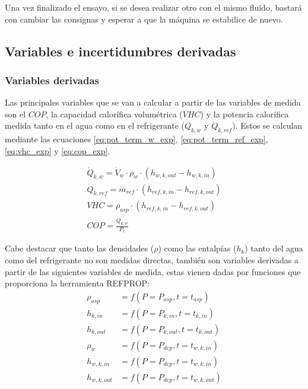 \documentclass[../main.tex]{subfiles}
\begin{document}
Una vez finalizado el ensayo, si se desea realizar otro con el mismo fluido, bastará con cambiar las consignas y esperar a que la máquina se estabilice de nuevo.

\newpage

\subsection{Variables e incertidumbres derivadas}

\subsubsection{Variables derivadas}

Las principales variables que se van a calcular a partir de las variables de medida son el $COP$, la capacidad calorífica volumétrica ($VHC$) y la potencia calorífica medida tanto en el agua como en el refrigerante ($\dot{Q}_{k,w}$ y $\dot{Q}_{k,ref}$). Estos se calculan mediante las ecuaciones \ref{eq:pot_term_w_exp}, \ref{eq:pot_term_ref_exp}, \ref{eq:vhc_exp} y \ref{eq:cop_exp}.

\begin{gather}
    \dot{Q}_{k,w} = \dot{V}_{w} \cdot \rho_{w} \cdot \left( h_{w, k, out} - h_{w, k, in} \right)
    \label{eq:pot_term_w_exp}  \\
    \dot{Q}_{k,ref} = \dot{m}_{ref} \cdot \left( h_{ref,k,in} - h_{ref,k,out} \right)
    \label{eq:pot_term_ref_exp} \\
    VHC = \rho_{asp} \cdot \left( h_{ref,k, in} - h_{ref,k, out} \right)
    \label{eq:vhc_exp} \\
    COP = \frac{\dot{Q}_{k,w}}{P_{c}}
    \label{eq:cop_exp}
\end{gather}

Cabe destacar que tanto las densidades ($\rho$) como las entalpías ($h_{k}$) tanto del agua como del refrigerante no son medidas directas, también son variables derivadas a partir de las siguientes variables de medida, estas vienen dadas por funciones que proporciona la herramienta REFPROP:
\begin{align}
    \rho_{asp} &= f(P = P_{asp}, t = t_{asp})
    \label{eq:dens_asp_exp} \\
    h_{k, in} &= f(P = P_{k, in}, t = t_{k, in})
    \label{eq:h_k_in_exp} \\
    h_{k, out} &= f(P = P_{k, out}, t = t_{k, out})
    \label{eq:h_k_out_exp} \\
    \rho_{w} &= f(P = P_{dep}, t = t_{w, k, in})
    \label{eq:dens_agua_exp} \\
    h_{w, k, in} &= f(P = P_{dep}, t = t_{w, k, in})
    \label{eq:h_w_k_in_exp} \\
    h_{w, k, out} &= f(P = P_{dep}, t = t_{w, k, out})
    \label{eq:h_w_k_out_exp}
\end{align}
\end{document}
